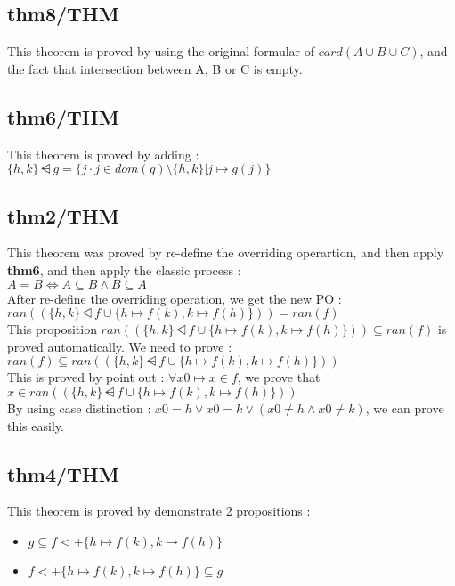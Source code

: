 \subsection{thm8/THM}
This theorem is proved by using the original formular of $card(A \cup B \cup C)$, and the fact that intersection between A, B or C is empty.

\subsection{thm6/THM}
This theorem is proved by adding : \\
$\{h, k\} \dsub g = \{j \cdot j \in dom(g) \setminus \{h,k \} | j \mapsto g(j)  \} $

\subsection{thm2/THM}
This theorem was proved by re-define the overriding operartion, and then apply \textbf{thm6}, and then apply the classic process : \\
$A = B \Leftrightarrow A \subseteq B \land B \subseteq A $ \\
After re-define the overriding operation, we get the new PO : \\
$ran((\{h,k\} \dsub f \cup \{h \mapsto f(k), k \mapsto f(h) \})) = ran(f) $\\
This proposition $ran((\{h,k\} \dsub f \cup \{h \mapsto f(k), k \mapsto f(h) \})) \subseteq ran(f) $ is proved automatically. We need to prove : \\
$ran(f) \subseteq ran((\{h,k\} \dsub f \cup \{h \mapsto f(k), k \mapsto f(h) \}))$ \\
This is proved by point out : $\forall x0 \mapsto x \in f$, we prove that $x \in ran((\{h,k\} \dsub f \cup \{h \mapsto f(k), k \mapsto f(h) \}))$ \\
By using case distinction : $x0=h \lor x0=k \lor (x0 \neq h \land x0 \neq k)$, we can prove this easily.

\subsection{thm4/THM}
This theorem is proved by demonstrate 2 propositions :
\begin{itemize}
\item $g \subseteq f <+ \{h \mapsto f(k), k \mapsto f(h) \}$
\item $f <+ \{h \mapsto f(k), k \mapsto f(h) \} \subseteq g$
\end{itemize}

